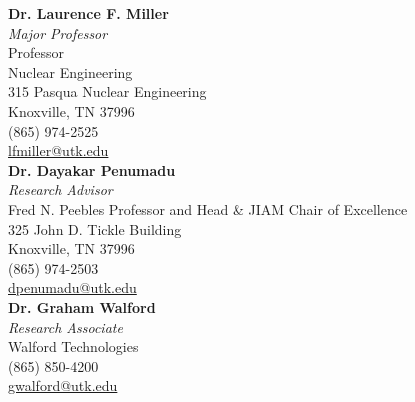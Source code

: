 \documentclass[11pt,a4paper,sans]{moderncv}
\begin{document}
\makecvtitle
\large

  \vspace{2cm}

  \textbf{Dr. Laurence F. Miller}\\
  \textit{Major Professor}\\
  Professor \\
  Nuclear Engineering\\315 Pasqua Nuclear Engineering\\Knoxville, TN 37996\\
  (865) 974-2525 \\
  \href{mailto:lfmiller@utk.edu}{lfmiller@utk.edu}\\

  \vspace{1cm}
  \textbf{Dr. Dayakar Penumadu}\\
  \textit{Research Advisor} \\
  Fred N. Peebles Professor and Head \& JIAM Chair of Excellence \\
  325 John D. Tickle Building \\
  Knoxville, TN 37996\\
  (865) 974-2503  \\
  \href{mailto:dpenumad@utk.edu}{dpenumadu@utk.edu}\\

  \vspace{1cm}
  \textbf{Dr. Graham Walford} \\
  \textit{Research Associate}  \\
  Walford Technologies \\
  (865) 850-4200 \\
  \href{mailto:gwalford@utk.edu}{gwalford@utk.edu} \\
\end{document}
